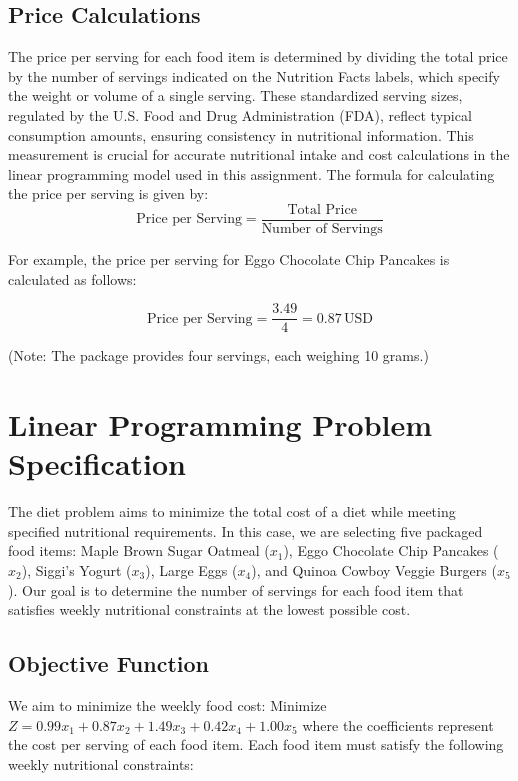 \documentclass{article}
\begin{document}
\subsection{Price Calculations}
The price per serving for each food item is determined by dividing the total price by the number of servings indicated on the Nutrition Facts labels, which specify the weight or volume of a single serving. These standardized serving sizes, regulated by the U.S. Food and Drug Administration (FDA), reflect typical consumption amounts, ensuring consistency in nutritional information. This measurement is crucial for accurate nutritional intake and cost calculations in the linear programming model used in this assignment. The formula for calculating the price per serving is given by:  $$\text{Price per Serving} = \frac{\text{Total Price}}{\text{Number of Servings}}$$

For example, the price per serving for Eggo Chocolate Chip Pancakes is calculated as follows:

$$\text{Price per Serving} = \frac{3.49}{4} = 0.87 \, \text{USD}$$

(Note: The package provides four servings, each weighing 10 grams.)



\section{Linear Programming Problem Specification}


The diet problem aims to minimize the total cost of a diet while meeting specified nutritional requirements. In this case, we are selecting five packaged food items: Maple Brown Sugar Oatmeal ($x_1$), Eggo Chocolate Chip Pancakes ($x_2$), Siggi’s Yogurt ($x_3$), Large Eggs ($x_4$), and Quinoa Cowboy Veggie Burgers ($x_5$). Our goal is to determine the number of servings for each food item that satisfies weekly nutritional constraints at the lowest possible cost.

\subsection{Objective Function}
We aim to minimize the weekly food cost: Minimize $Z = 0.99x_1 + 0.87x_2 + 1.49x_3 + 0.42x_4 + 1.00x_5$ where the coefficients represent the cost per serving of each food item. Each food item must satisfy the following weekly nutritional constraints: 
\end{document}
